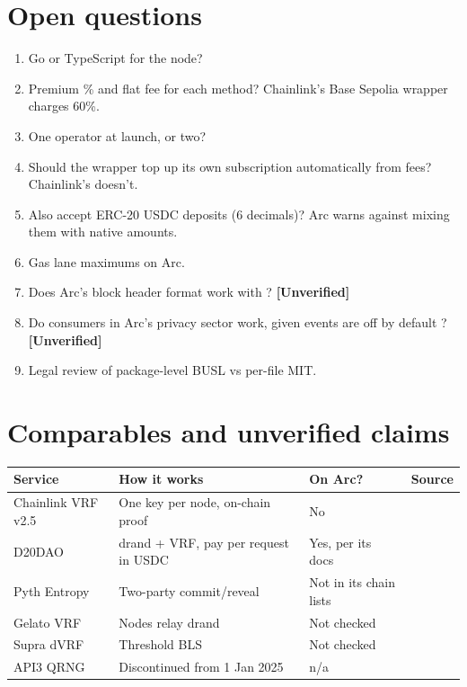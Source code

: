 \documentclass[11pt,a4paper]{article}
\begin{document}
\section{Open questions}
\begin{enumerate}
  \item Go or TypeScript for the node?
  \item Premium \% and flat fee for each method? Chainlink's Base Sepolia wrapper charges 60\%.
  \item One operator at launch, or two?
  \item Should the wrapper top up its own subscription automatically from fees? Chainlink's doesn't.
  \item Also accept ERC-20 USDC deposits (6 decimals)? Arc warns against mixing them with native amounts.
  \item Gas lane maximums on Arc.
  \item Does Arc's block header format work with ? \textbf{[Unverified]}
  \item Do consumers in Arc's privacy sector work, given events are off by default \cite{arcprivacy}? \textbf{[Unverified]}
  \item Legal review of package-level BUSL vs per-file MIT.
\end{enumerate}

\section{Comparables and unverified claims}
{\small
\begin{tabularx}{\textwidth}{P{2.6cm}LP{2.6cm}P{1.2cm}}
\toprule
Service & How it works & On Arc? & Source\\
\midrule
Chainlink VRF v2.5 & One key per node, on-chain proof & No & \cite{clnetworks}\\
D20DAO & drand + VRF, pay per request in USDC & Yes, per its docs & \cite{d20dao}\\
Pyth Entropy & Two-party commit/reveal & Not in its chain lists & \cite{pyth}\\
Gelato VRF & Nodes relay drand & Not checked & \cite{gelato}\\
Supra dVRF & Threshold BLS & Not checked & \cite{supra}\\
API3 QRNG & Discontinued from 1 Jan 2025 & n/a & \cite{api3}\\
\bottomrule
\end{tabularx}}
\end{document}
